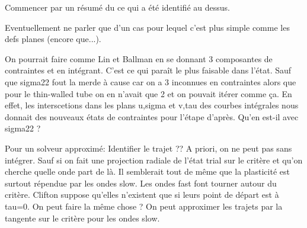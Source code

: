 Commencer par un résumé du ce qui a été identifié au dessus.

Eventuellement ne parler que d'un cas pour lequel c'est plus simple comme les defs planes (encore que...).

On pourrait faire comme Lin et Ballman \cite{Lin_et_Ballman} en se donnant 3 composantes de contraintes et en intégrant. 
C'est ce qui paraît le plus faisable dans l'état. 
Sauf que sigma22 fout la merde à cause car on a 3 inconnues en contraintes alors que pour le thin-walled tube on en n'avait que 2 et on pouvait itérer comme ça.
En effet, les interscetions dans les plans u,sigma et v,tau des courbes intégrales nous donnait des nouveaux états de contraintes pour l'étape d'après. 
Qu'en est-il avec sigma22 ?


Pour un solveur approximé:
Identifier le trajet ?? A priori, on ne peut pas sans intégrer.
Sauf si on fait une projection radiale de l'état trial sur le critère et qu'on cherche quelle onde part de là.
Il semblerait tout de même que la plasticité est surtout répendue par les ondes slow.
Les ondes fast font tourner autour du critère. 
Clifton suppose qu'elles n'existent que si leurs point de départ est à tau=0. On peut faire la même chose ?
On peut approximer les trajets par la tangente sur le critère pour les ondes slow.








